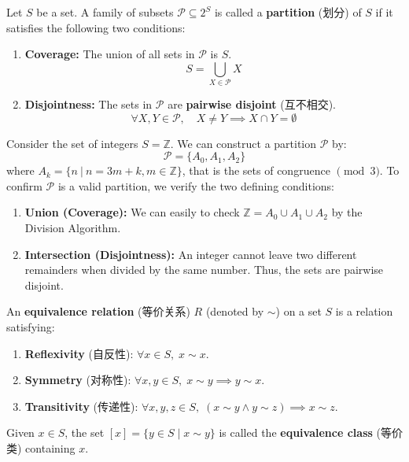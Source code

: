\documentclass[
	UTF-8,
	11pt, %
	a4paper, %
]{LegrandOrangeBook}
\begin{document}
\begin{definition}[Partition]
Let $S$ be a set. A family of subsets $\mathcal{P} \subseteq 2^S$ is called a \textbf{partition} (划分) of $S$ if it satisfies the following two conditions:
\begin{enumerate}
    \item \textbf{Coverage:} The union of all sets in $\mathcal{P}$ is $S$.
    \[ S = \bigcup_{X \in \mathcal{P}} X \]
    \item \textbf{Disjointness:} The sets in $\mathcal{P}$ are \textbf{pairwise disjoint} (互不相交).
    \[ \forall X, Y \in \mathcal{P}, \quad X \neq Y \implies X \cap Y = \emptyset \]
\end{enumerate}
\end{definition}

\begin{example}
	Consider the set of integers $S = \mathbb{Z}$. We can construct a partition $\mathcal{P}$ 
	by:
	$$ \mathcal{P} = \{ A_0, A_1, A_2 \}  $$
	where $A_k = \{ n \ | \ n=3m+k , m\in \mathbb{Z} \}$, that is the sets of congruence $\pmod 3$.
To confirm $\mathcal{P}$ is a valid partition, we verify the two defining conditions:
\begin{enumerate}
    \item \textbf{Union (Coverage):} 
    We can easily to check 
    \( \mathbb{Z} = A_0 \cup A_1 \cup A_2 \)
	by the Division Algorithm.
    
    \item \textbf{Intersection (Disjointness):} 
    An integer cannot leave two different remainders when divided by the same number. 
	Thus, the sets are pairwise disjoint.
\end{enumerate}
\end{example}


\begin{definition}
An \textbf{equivalence relation} (等价关系) $R$ (denoted by $\sim$) on a set $S$ is a relation satisfying:
\begin{enumerate}
    \item \textbf{Reflexivity} (自反性): $\forall x \in S, \; x \sim x$.
    \item \textbf{Symmetry} (对称性): $\forall x, y \in S, \; x \sim y \implies y \sim x$.
    \item \textbf{Transitivity} (传递性): $\forall x, y, z \in S, \; (x \sim y \land y \sim z) \implies x \sim z$.
\end{enumerate}
Given $x \in S$, the set $[x] = \{y \in S \mid x \sim y\}$ is called the \textbf{equivalence class} (等价类) containing $x$.
\end{definition}
\end{document}
